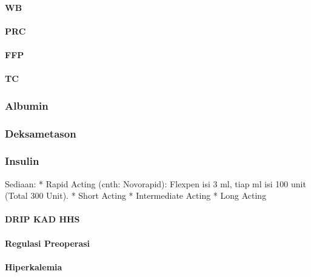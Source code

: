 \documentclass[
]{book}
\begin{document}
\hypertarget{wb}{%
\paragraph{WB}\label{wb}}

\hypertarget{prc}{%
\paragraph{PRC}\label{prc}}

\hypertarget{ffp}{%
\paragraph{FFP}\label{ffp}}

\hypertarget{tc}{%
\paragraph{TC}\label{tc}}

\hypertarget{albumin}{%
\subsubsection{Albumin}\label{albumin}}

\hypertarget{deksametason}{%
\subsubsection{Deksametason}\label{deksametason}}

\hypertarget{insulin}{%
\subsubsection{Insulin}\label{insulin}}

Sediaan:
* Rapid Acting (cnth: Novorapid): Flexpen isi 3 ml, tiap ml isi 100 unit (Total 300 Unit).
* Short Acting
* Intermediate Acting
* Long Acting

\hypertarget{drip-kad-hhs}{%
\paragraph{DRIP KAD HHS}\label{drip-kad-hhs}}

\hypertarget{regulasi-preoperasi}{%
\paragraph{Regulasi Preoperasi}\label{regulasi-preoperasi}}

\hypertarget{hiperkalemia-1}{%
\paragraph{Hiperkalemia}\label{hiperkalemia-1}}
\end{document}
